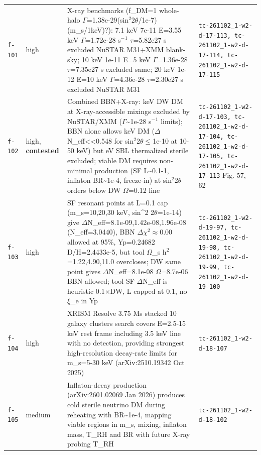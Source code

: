 \documentclass[11pt,a4paper]{article}
\begin{document}
\begin{longtable}{@{}p{}p{}p{}p{}@{}}
\texttt{f-101} & high & X-ray benchmarks (f\_DM=1 whole-halo $\Gamma$=1.38e-29(sin$^2$2$\theta$/1e-7)(m\_s/1keV)?): 7.1 keV 7e-11 E=3.55 keV $\Gamma$=1.72e-28 s$^-$$^1$ $\tau$=5.82e27 s excluded NuSTAR M31+XMM blank-sky; 10 keV 1e-11 E=5 keV $\Gamma$=1.36e-28 $\tau$=7.35e27 s excluded same; 20 keV 1e-12 E=10 keV $\Gamma$=4.36e-28 $\tau$=2.30e27 s excluded NuSTAR M31 & \texttt{tc-261102\_\allowbreak{}1-w2-d-17-113,\allowbreak{} tc-261102\_\allowbreak{}1-w2-d-17-114,\allowbreak{} tc-261102\_\allowbreak{}1-w2-d-17-115} \\
\texttt{f-102} & high, \textbf{contested} & Combined BBN+X-ray: keV DW DM at X-ray-accessible mixings excluded by NuSTAR/XMM ($\Gamma$\textasciitilde{}1e-28 s$^-$$^1$ limits); BBN alone allows keV DM ($\Delta$N\_eff\textless{}\textless{}0.548 for sin$^2$2$\theta$$\leq$1e-10 at 10-50 keV) but eV SBL thermalized sterile excluded; viable DM requires non-minimal production (SF L\textasciitilde{}0.1-1, inflaton BR\textasciitilde{}1e-4, freeze-in) at sin$^2$2$\theta$ orders below DW $\Omega$=0.12 line & \texttt{tc-261102\_\allowbreak{}1-w2-d-17-103,\allowbreak{} tc-261102\_\allowbreak{}1-w2-d-17-104,\allowbreak{} tc-261102\_\allowbreak{}1-w2-d-17-105,\allowbreak{} tc-261102\_\allowbreak{}1-w2-d-17-113} Fig. 57, 62 \\
\texttt{f-103} & high & SF resonant points at L=0.1 cap (m\_s=10,20,30 keV, sin\textasciicircum{}2 2$\theta$=1e-14) give $\Delta$N\_eff=8.1e-09,1.42e-08,1.96e-08 (N\_eff=3.0440), BBN $\Delta$$\chi$$^2$$\approx$0.00 allowed at 95\%, Yp=0.24682 D/H=2.4433e-5, but tool $\Omega$\_s h$^2$=1.22,4.90,11.0 overcloses; DW same point gives $\Delta$N\_eff=8.1e-08 $\Omega$=8.7e-06 BBN-allowed; tool SF $\Delta$N\_eff is heuristic 0.1$\times$DW, L capped at 0.1, no $\xi$\_e in Yp & \texttt{tc-261102\_\allowbreak{}1-w2-d-19-97,\allowbreak{} tc-261102\_\allowbreak{}1-w2-d-19-98,\allowbreak{} tc-261102\_\allowbreak{}1-w2-d-19-99,\allowbreak{} tc-261102\_\allowbreak{}1-w2-d-19-100} \\
\texttt{f-104} & high & XRISM Resolve 3.75 Ms stacked 10 galaxy clusters search covers E=2.5-15 keV rest frame including 3.5 keV line with no detection, providing strongest high-resolution decay-rate limits for m\_s=5-30 keV (arXiv:2510.19342 Oct 2025) & \texttt{tc-261102\_\allowbreak{}1-w2-d-18-107} \\
\texttt{f-105} & medium & Inflaton-decay production (arXiv:2601.02069 Jan 2026) produces cold sterile neutrino DM during reheating with BR\textasciitilde{}1e-4, mapping viable regions in m\_s, mixing, inflaton mass, T\_RH and BR with future X-ray probing T\_RH & \texttt{tc-261102\_\allowbreak{}1-w2-d-18-102} \\

\end{longtable}
\end{document}
